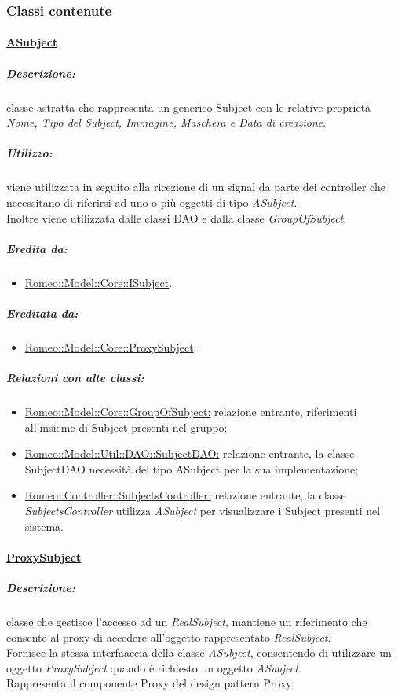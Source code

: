 		\subsubsection{Classi contenute}	
		\paragraph{\underline{ASubject}} 
		\label{core_asub}
			\subparagraph{Descrizione:} classe astratta che rappresenta un generico Subject\g{} con le relative proprietà \emph{Nome, Tipo del Subject\g{}, Immagine, Maschera e Data di creazione}.
			
			\subparagraph{Utilizzo:} viene utilizzata in seguito alla ricezione di un signal\g{} da
			 parte dei controller che necessitano di riferirsi ad uno o più oggetti di tipo \textsl{ASubject}.
			\\Inoltre viene utilizzata dalle classi DAO e dalla classe \textsl{GroupOfSubject}.
			
			\subparagraph{Eredita da:}
				\begin{itemize}
					\item \hyperref[core_isub]{Romeo::Model::Core::ISubject}.
				\end{itemize}
				
			\subparagraph{Ereditata da:}
				\begin{itemize}
					\item \hyperref[core_proxysub]{Romeo::Model::Core::ProxySubject}.
				\end{itemize}
				
			\subparagraph{Relazioni con alte classi:}
				\begin{itemize}
					\item \hyperref[group]{Romeo::Model::Core::GroupOfSubject:} relazione entrante, riferimenti all'insieme di Subject\g{} presenti nel gruppo;
					\item \hyperref[]{Romeo::Model::Util::DAO::SubjectDAO:} relazione entrante, la classe SubjectDAO necessità del tipo ASubject per la sua implementazione;
					\item \hyperref[]{Romeo::Controller::SubjectsController:} relazione entrante, la classe \textsl{SubjectsController} utilizza \textsl{ASubject} per visualizzare i Subject\g{} presenti nel sistema.
				\end{itemize}
			
		\paragraph{\underline{ProxySubject}} 
		\label{core_proxysub}
			\subparagraph{Descrizione:} classe che gestisce l’accesso ad un \textsl{RealSubject}, mantiene un riferimento che consente al proxy di accedere all’oggetto rappresentato \textsl{RealSubject}.
			\\Fornisce la stessa interfaaccia della classe \textsl{ASubject}, consentendo di utilizzare un oggetto \textsl{ProxySubject} quando è richiesto un oggetto \textsl{ASubject}.
			\\Rappresenta il componente Proxy del design pattern\g{} Proxy.
			
